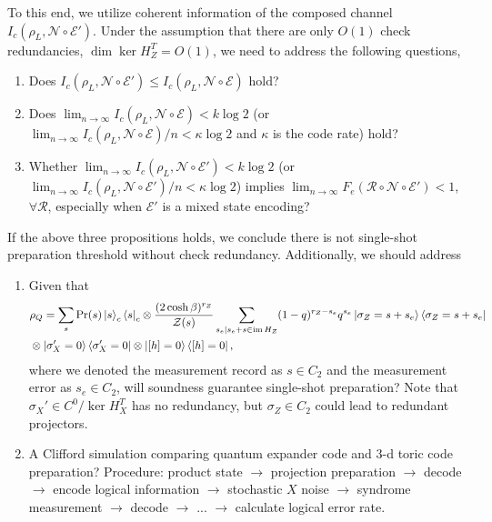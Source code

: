 \documentclass[twoside,english,aps,showpacs,pra,superscriptaddress]{revtex4-2}
\DeclareMathOperator{\im}{im}
\begin{document}
To this end, we utilize coherent information of the composed channel $I_c(\rho_L,\mathcal{N\circ E'})$. Under the assumption that there are only $O(1)$ check redundancies, $\dim \ker H_Z^T = O(1)$, we need to address the following questions,
\begin{enumerate}
    \item Does $I_c(\rho_L,\mathcal{N\circ E'}) \leq I_c(\rho_L,\mathcal{N\circ E})$ hold?
    \item Does $\lim_{n\rightarrow\infty} I_c(\rho_L,\mathcal{N\circ E}) < k\log 2$ (or $\lim_{n\rightarrow\infty} I_c(\rho_L,\mathcal{N\circ E})/n < \kappa\log 2$ and $\kappa$ is the code rate) hold?
    \item Whether $\lim_{n\rightarrow\infty}  I_c(\rho_L,\mathcal{N\circ E'}) < k \log 2$ (or $\lim_{n\rightarrow\infty} I_c(\rho_L,\mathcal{N\circ E'})/n < \kappa\log 2$) implies $\lim_{n\rightarrow\infty}F_e(\mathcal{R\circ N\circ E'}) < 1$, $\forall\mathcal{R}$, especially when $\mathcal{E}'$ is a mixed state encoding?
\end{enumerate}
If the above three propositions holds, we conclude there is not single-shot preparation threshold without check redundancy.
Additionally, we should address
\begin{enumerate}
    \item Given that 
    \begin{equation}
    \begin{aligned}
        &\rho_Q = \sum_s \Pr(s) \ket{s}_c\bra{s}_c \otimes \frac{(2\cosh\beta)^{r_Z}}{\mathcal{Z}(s)}\sum_{s_e|s_e+s\in \im H_Z}  (1-q)^{r_Z - s_e} q^{s_e} \ket{\sigma_{Z} = s+s_e}\bra{\sigma_{Z} = s+s_e}\\& \otimes \ket{\sigma_{X}' = 0}\bra{\sigma_{X}' = 0} \otimes \ket{[h]=0}\bra{[h]=0},
    \end{aligned}
    \end{equation}
    where we denoted the measurement record as $s\in C_2$ and the measurement error as $s_e \in C_2$, will soundness guarantee single-shot preparation? Note that $\sigma_X' \in C^0/\ker{H_X^T}$ has no redundancy, but $\sigma_Z \in C_2$ could lead to redundant projectors.
    \item A Clifford simulation comparing quantum expander code and $3$-d toric code preparation? Procedure: product state $\rightarrow$ projection preparation $\rightarrow$ decode $\rightarrow$ encode logical information $\rightarrow$ stochastic $X$ noise $\rightarrow$ syndrome measurement $\rightarrow$ decode $\rightarrow$ ... $\rightarrow$ calculate logical error rate.
\end{enumerate}
\end{document}
